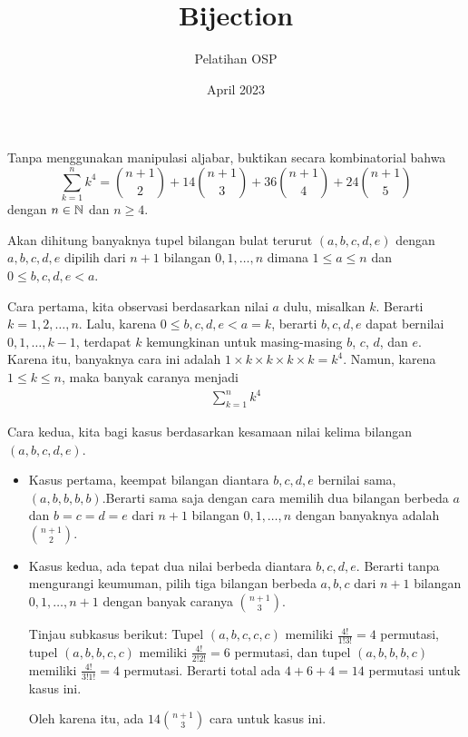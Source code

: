 \documentclass[12pt]{scrartcl}
\title{Bijection}
\author{Pelatihan OSP}
\date{April 2023}
\begin{document}
\maketitle

\renewcommand*\contentsname{Daftar Isi}
\tableofcontents

\newpage
\begin{soaljawab}
    Tanpa menggunakan manipulasi aljabar, buktikan secara kombinatorial bahwa
    $$\sum_{k=1}^{n} k^4 = {n+1 \choose 2} + 14{n+1 \choose 3}+36{n+1 \choose 4}+24{n+1 \choose 5}$$ dengan $n\in \mathbb N$ dan $n \ge 4$.
    \begin{solusi}
        Akan dihitung banyaknya tupel bilangan bulat terurut $(a,b,c,d,e)$ dengan $a,b,c,d,e$ dipilih dari $n+1$ bilangan $0,1,\dots,n$ dimana $1 \le a \le n$ dan $0 \le b,c,d,e < a$.
		
	Cara pertama, kita observasi berdasarkan nilai $a$ dulu, misalkan $k$. Berarti $k=1,2,\dots,n$. Lalu, karena $0 \le b,c,d,e < a=k$, berarti $b,c,d,e$ dapat bernilai $0,1,\dots,k-1$, terdapat $k$ kemungkinan untuk masing-masing $b$, $c$, $d$, dan $e$. Karena itu, banyaknya cara ini adalah $1 \times k \times k \times k \times k = k^4$. Namun, karena $1 \le k \le n$, maka banyak caranya menjadi
		\begin{align*}
		\sum_{k=1}^{n} k^4
		\end{align*}
		
	Cara kedua, kita bagi kasus berdasarkan kesamaan nilai kelima bilangan $(a,b,c,d,e)$.
		\begin{itemize}
		\item Kasus pertama, keempat bilangan diantara $b,c,d,e$ bernilai sama, $(a,b,b,b,b)$.Berarti sama saja dengan cara memilih dua bilangan berbeda $a$ dan $b=c=d=e$ dari $n+1$ bilangan $0,1,\dots,n$ dengan banyaknya adalah ${n+1 \choose 2}$.
		
		\item Kasus kedua, ada tepat dua nilai berbeda diantara $b,c,d,e$. Berarti tanpa mengurangi keumuman, pilih tiga bilangan berbeda $a,b,c$ dari $n+1$ bilangan $0,1,\dots,n+1$ dengan banyak caranya ${n+1 \choose 3}$.
		
		Tinjau subkasus berikut: Tupel $(a,b,c,c,c)$ memiliki $\frac{4!}{1!3!} = 4$ permutasi, tupel $(a,b,b,c,c)$ memiliki $\frac{4!}{2!2!}=6$ permutasi, dan tupel $(a,b,b,b,c)$ memiliki $\frac{4!}{3!1!}=4$ permutasi. Berarti total ada $4+6+4=14$ permutasi untuk kasus ini.
		
		Oleh karena itu, ada $14{n+1 \choose 3}$ cara untuk kasus ini.
		

\end{itemize}
\end{solusi}
\end{soaljawab}
\end{document}
